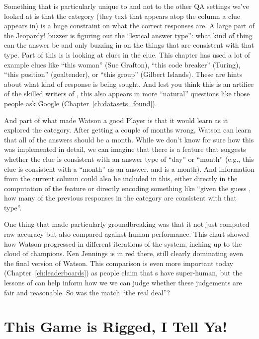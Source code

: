 Something that is particularly unique to \jeopardy{} and not to the
other QA settings we’ve looked at is that the category (they text that appears
atop the column a clue appears in) is a huge
constraint on what the correct responses are.
%
A large part of the
Jeopardy! buzzer is figuring out the ``lexical answer type'': what kind of
thing can the answer be and only buzzing in on the things that are consistent
with that type.
%
Part of
this is is looking at clues in the clue.
%
This chapter has used a lot of example clues like ``this woman'' (Sue
Grafton), ``this code breaker'' (Turing), ``this position'' (goaltender), or
``this group'' (Gilbert Islands).
%
These are hints about what kind of response is being sought.
%
And lest you think this is an artifice of the skilled writers of \jeopardy{},
this also appears in more ``natural'' questions like those people ask Google
(Chapter~\ref{ch:datasets_found}).

And part of what made Watson a good \jeopardy{} Player is that it would learn
as it explored the category.
%
After getting a couple of months wrong, Watson
can learn that all of the answers should be a month.
%
While we don't know for sure how this was implemented in detail, we can
imagine that there is a feature that suggests whether the clue is consistent
with an answer type of ``day'' or ``month'' (e.g., this clue is consistent
with a ``month'' as an answer, and  is a month).
%
And information from the current column could also be included in this, either
directly in the computation of the feature or directly encoding something like
``given the guess , how many of the previous responses in the
category are consistent with that type''.

One thing that made \watson{} particularly groundbreaking was that it not just
computed raw accuracy but also compared against human performance.
%
This chart showed how Watson progressed in different iterations of the system,
inching up to the cloud of \jeopardy{} champions.  Ken Jennings is in red there,
still clearly dominating even the final version of Watson.
%
This comparison is even more important today (Chapter~\ref{ch:leaderboards}) as people claim that s
have super-human, but the lessons of \watson{} can
help inform how we we can judge whether these judgements are fair and
reasonable.
%
So was the \watson{} match ``the real deal''?

\section{This Game is Rigged, I Tell Ya!}

